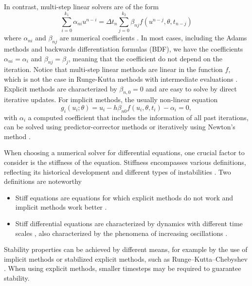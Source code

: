 In contrast, multi-step linear solvers are of the form 
\begin{equation}
    \sum_{i=0}^{k_1} \alpha_{ni} u^{n-i} 
    =
    \Delta t_n \sum_{j=0}^{k_2} \beta_{nj} f(u^{n-j}, \theta, t_{n-j})
\end{equation}
where $\alpha_{ni}$ and $\beta_{nj}$ are numerical coefficients \cite{hairer-solving-1}.
In most cases, including the Adams methods and backwards differentiation formulas (BDF), we have the coefficients $\alpha_{ni} = \alpha_i$ and $\beta_{nj}=\beta_j$, meaning that the coefficient do not depend on the iteration. 
Notice that multi-step linear methods are linear in the function $f$, which is not the case in Runge-Kutta methods with intermediate evaluations \cite{ascher2008numerical}.
Explicit methods are characterized by $\beta_{n, 0} = 0$ and are easy to solve by direct iterative updates. 
For implicit methods, the usually non-linear equation 
\begin{equation}
    g_i(u_i; \theta) = u_i - h \beta_{n0} f(u_i, \theta, t_i) - \alpha_i = 0,
    \label{eq:solver-constriant-example}
\end{equation}
with $\alpha_i$ a computed coefficient that includes the information of all past iterations, can be solved using predictor-corrector methods \cite{hairer-solving-1} or iteratively using Newton's method \cite{SUNDIALS-hindmarsh2005sundials}.  

When choosing a numerical solver for differential equations, one crucial factor to consider is the stiffness of the equation.
Stiffness encompasses various definitions, reflecting its historical development and different types of instabilities \cite{Dahlquist_1985}.
Two definitions are noteworthy
\begin{itemize}
    \item Stiff equations are equations for which explicit methods do not work and implicit methods work better \cite{hairer-solving-2}.
    \item Stiff differential equations are characterized by dynamics with different time scales \cite{hairer-solving-2, kim_stiff_2021}, also characterized by the phenomena of increasing oscillations \cite{Dahlquist_1985}.
\end{itemize} 
Stability properties can be achieved by different means, for example by the use of implicit methods or stabilized explicit methods, such as Runge–Kutta–Chebyshev \cite{van1980internal, hairer-solving-2}. 
When using explicit methods, smaller timesteps may be required to guarantee stability. 

